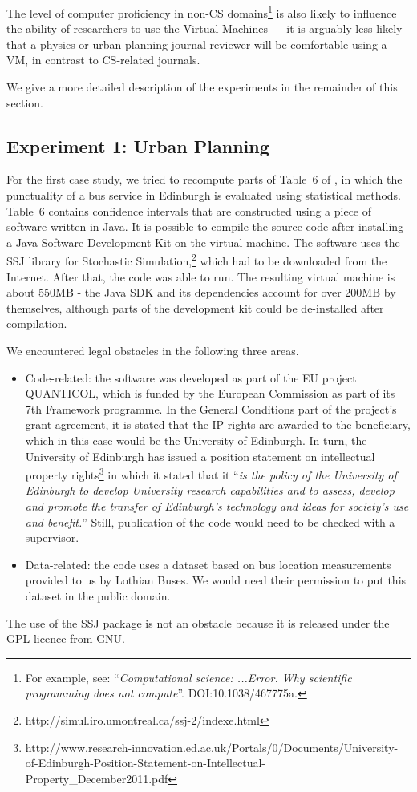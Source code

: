 The level of computer proficiency in non-CS domains\footnote{For example, see: ``\emph{Computational science: ...Error. Why scientific programming does not compute}''. DOI:10.1038/467775a.} is also likely to influence the ability of researchers to use the Virtual Machines --- it is arguably less likely that a physics or urban-planning journal reviewer will be comfortable using a VM, in contrast to CS-related journals.

We give a more detailed description of the experiments in the remainder of this section.

\subsection*{Experiment 1: Urban Planning}

For the first case study, we tried to recompute parts of Table~6 of \cite{danielpaper}, in which the punctuality of a bus service in Edinburgh is evaluated using statistical methods. Table~6 contains confidence intervals that are constructed using a piece of software written in Java. It is possible to compile the source code after installing a Java Software Development Kit on the virtual machine. The software uses the SSJ library for Stochastic Simulation,\footnote{http://simul.iro.umontreal.ca/ssj-2/indexe.html} which had to be downloaded from the Internet. After that, the code was able to run.
The resulting virtual machine is about 550MB - the Java SDK and its dependencies account for over 200MB by themselves, although parts of the development kit could be de-installed after compilation.

We encountered legal obstacles in the following three areas.
\begin{itemize} 
\item Code-related: the software was developed as part of the EU project QUANTICOL, which is funded by the European Commission as part of its 7th Framework programme. In the General Conditions part of the project's grant agreement, it is stated that the IP rights are awarded to the beneficiary, which in this case would be the University of Edinburgh. In turn, the University of Edinburgh has issued a position statement on intellectual property rights\footnote{http://www.research-innovation.ed.ac.uk/Portals/0/Documents/University-of-Edinburgh-Position-Statement-on-Intellectual-Property\_December2011.pdf} in which it stated that it ``\emph{is the policy of the University of Edinburgh to develop University research capabilities and to assess, develop and promote the transfer of Edinburgh's technology and ideas for society's use and benefit.}'' Still, publication of the code would need to be checked with a supervisor.
\item Data-related: the code uses a dataset based on bus location measurements provided to us by Lothian Buses. We would need their permission to put this dataset in the public domain.
\end{itemize}
The use of the SSJ package is not an obstacle because it is released under the GPL licence from GNU.

